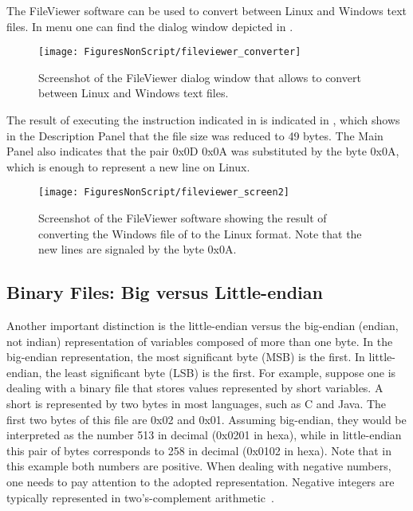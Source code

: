 The FileViewer software can be used to convert between Linux and Windows text files. In menu  one can find the dialog window depicted in .

\begin{figure}
	\centering
		\texttt{[image: FiguresNonScript/fileviewer\_converter]}		
	\caption{Screenshot of the FileViewer dialog window that allows to convert between Linux and Windows text files.\label{fig:fileviewer_converter}}
\end{figure}

The result of executing the instruction indicated in  is indicated in , which shows in the Description Panel that the file size was reduced to 49 bytes. The Main Panel also indicates that the pair 0x0D 0x0A was substituted by the byte 0x0A, which is enough to represent a new line on Linux.

\begin{figure}
	\centering
		\texttt{[image: FiguresNonScript/fileviewer\_screen2]}		
	\caption[{Screenshot of the FileViewer software showing the result of converting the Windows file of  to the Linux format.}]{Screenshot of the FileViewer software showing the result of converting the Windows file of  to the Linux format. Note that the new lines are signaled by the byte 0x0A.\label{fig:fileviewer_screen2}}
\end{figure}

\subsection{Binary Files: Big versus Little-endian}
\label{app:endianness}
Another important distinction is the little-endian versus the big-endian (endian, not indian) representation of variables composed of more than one byte. In the big-endian representation, the most significant byte (MSB) is the first. In little-endian, the least significant byte (LSB) is the first. For example, suppose one is dealing with a binary file that stores values represented by short variables. A short is represented by two bytes in most languages, such as C and Java. The first two bytes of this file are 0x02 and 0x01. Assuming big-endian, they would be interpreted as the number 513 in decimal (0x0201 in hexa), while in little-endian this pair of bytes corresponds to 258 in decimal (0x0102 in hexa).
Note that in this example both numbers are positive. When dealing with negative numbers, one needs to pay attention to the adopted representation. Negative integers are typically represented in two's-complement arithmetic~.

